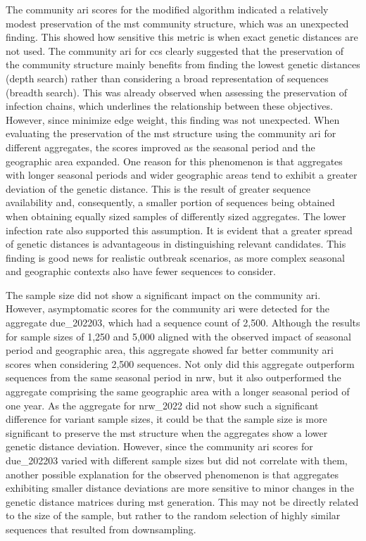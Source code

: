 The community \acrshort{ari} scores for the modified algorithm indicated a relatively modest preservation of the \acrshort{mst} community structure, which was an unexpected finding. This showed how sensitive this metric is when exact genetic distances are not used. The community \acrshort{ari} for \acrshort{ccs} clearly suggested that the preservation of the community structure mainly benefits from finding the lowest genetic distances (depth search) rather than considering a broad representation of sequences (breadth search). This was already observed when assessing the preservation of infection chains, which underlines the relationship between these objectives. However, since  minimize edge weight, this finding was not unexpected. When evaluating the preservation of the \acrshort{mst} structure using the community \acrshort{ari} for different aggregates, the scores improved as the seasonal period and the geographic area expanded. One reason for this phenomenon is that aggregates with longer seasonal periods and wider geographic areas tend to exhibit a greater deviation of the genetic distance. This is the result of greater sequence availability and, consequently, a smaller portion of sequences being obtained when obtaining equally sized samples of differently sized aggregates. The lower infection rate also supported this assumption. It is evident that a greater spread of genetic distances is advantageous in distinguishing relevant candidates. This finding is good news for realistic outbreak scenarios, as more complex seasonal and geographic contexts also have fewer sequences to consider. 

The sample size did not show a significant impact on the community \acrshort{ari}. However, asymptomatic scores for the community \acrshort{ari} were detected for the aggregate due\_202203, which had a sequence count of 2,500. Although the results for sample sizes of 1,250 and 5,000 aligned with the observed impact of seasonal period and geographic area, this aggregate showed far better community \acrshort{ari} scores when considering 2,500 sequences. Not only did this aggregate outperform sequences from the same seasonal period in \acrshort{nrw}, but it also outperformed the aggregate comprising the same geographic area with a longer seasonal period of one year. As the aggregate for nrw\_2022 did not show such a significant difference for variant sample sizes, it could be that the sample size is more significant to preserve the \acrshort{mst} structure when the aggregates show a lower genetic distance deviation. However, since the community \acrshort{ari} scores for due\_202203 varied with different sample sizes but did not correlate with them, another possible explanation for the observed phenomenon is that aggregates exhibiting smaller distance deviations are more sensitive to minor changes in the genetic distance matrices during \acrshort{mst} generation. This may not be directly related to the size of the sample, but rather to the random selection of highly similar sequences that resulted from downsampling.

